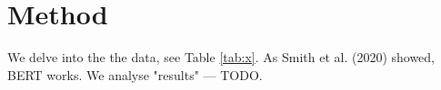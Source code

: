 \section{Method}
We delve into the the data, see Table \ref{tab:x}. As Smith et al. (2020) showed, BERT works.
We analyse "results" --- TODO.
